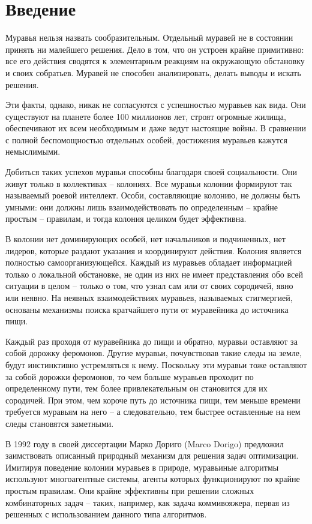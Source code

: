 \chapter*{Введение}\label{Input}

Муравья нельзя назвать сообразительным. Отдельный муравей не в
состоянии принять ни малейшего решения. Дело в том, что он устроен крайне
примитивно: все его действия сводятся к элементарным реакциям на окружающую обстановку и своих собратьев. 
Муравей не способен анализировать,
делать выводы и искать решения.

Эти факты, однако, никак не согласуются с успешностью муравьев как
вида. Они существуют на планете более 100 миллионов лет, строят огромные
жилища, обеспечивают их всем необходимым и даже ведут настоящие войны. В сравнении с полной беспомощностью отдельных особей, достижения
муравьев кажутся немыслимыми.

Добиться таких успехов муравьи способны благодаря своей социальности. Они живут только в коллективах – колониях. 
Все муравьи колонии формируют так называемый роевой интеллект. Особи, составляющие колонию,
не должны быть умными: они должны лишь взаимодействовать по определенным – крайне простым – правилам, и тогда колония целиком будет 
эффективна.

В колонии нет доминирующих особей, нет начальников и подчиненных, нет лидеров, которые раздают 
указания и координируют действия. Колония является полностью самоорганизующейся. Каждый из муравьев обладает
 информацией только о локальной обстановке, не один из них не имеет
представления обо всей ситуации в целом – только о том, что узнал сам или
от своих сородичей, явно или неявно. На неявных взаимодействиях муравьев,
называемых стигмергией, основаны механизмы поиска кратчайшего пути от
муравейника до источника пищи.

Каждый раз проходя от муравейника до пищи и обратно, муравьи
оставляют за собой дорожку феромонов. Другие муравьи, почувствовав такие следы на земле, 
будут инстинктивно устремляться к нему. Поскольку
эти муравьи тоже оставляют за собой дорожки феромонов, то чем больше
муравьев проходит по определенному пути, тем более привлекательным он
становится для их сородичей. При этом, чем короче путь до источника пищи, тем меньше времени требуется муравьям на него – а следовательно, тем
быстрее оставленные на нем следы становятся заметными.

В 1992 году в своей диссертации Марко Дориго (Marco Dorigo) предложил заимствовать описанный природный механизм для решения задач 
оптимизации. Имитируя поведение колонии муравьев в природе, муравьиные
алгоритмы используют многоагентные системы, агенты которых функционируют по крайне простым правилам. Они крайне эффективны при решении
сложных комбинаторных задач – таких, например, как задача коммивояжера, первая из решенных с использованием данного типа алгоритмов.

